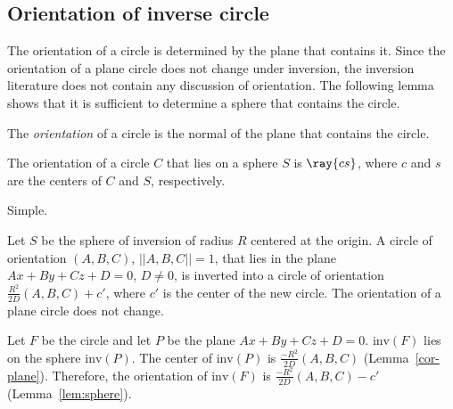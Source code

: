 

\subsection{Orientation of inverse circle}

The orientation of a circle is determined by the plane that contains it.
Since the orientation of a plane circle does not change under inversion, 
the inversion literature does not contain any discussion of orientation.
The following lemma shows that it is sufficient to determine a sphere
that contains the circle.
%
\begin{definition}
The {\em orientation} of a circle is the normal of the plane that contains
the circle.
\end{definition}

\begin{lemma}
\label{lem:sphere}
The orientation of a circle $C$ that lies on a sphere $S$ is $\ray{cs}$,
where $c$ and $s$ are the centers of $C$ and $S$, respectively.
\end{lemma}
Simple.
\QED


\begin{lemma}
\label{thm:orient}
Let $S$ be the sphere of inversion of radius $R$ centered at the origin.
A circle of orientation $(A,B,C)$, $||A,B,C|| = 1$,
that lies in the plane $Ax+By+Cz+D=0$, $D \neq 0$,
is inverted into a circle of orientation $\frac{R^{2}}{2D} (A,B,C) + c'$,
where $c'$ is the center of the new circle.
The orientation of a plane circle does not change.
\end{lemma}
Let $F$ be the circle and let $P$ be the plane $Ax+By+Cz+D=0$.
$\mbox{inv}(F)$ lies on the sphere $\mbox{inv}(P)$.
The center of $\mbox{inv}(P)$ is $\frac{-R^{2}}{2D} (A,B,C)$ 
(Lemma~\ref{cor-plane}).
Therefore, the orientation of $\mbox{inv}(F)$ is
$\frac{-R^{2}}{2D}(A,B,C) - c'$ (Lemma~\ref{lem:sphere}).
\QED

